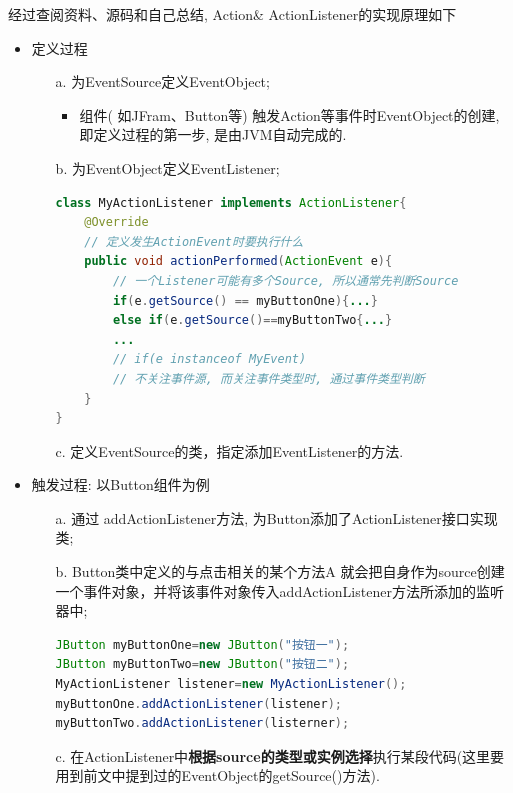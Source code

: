 \documentclass[12pt, a4paper, oneside]{ctexart}
\begin{document}
经过查阅资料、源码和自己总结, Action\& ActionListener的实现原理如下
\begin{itemize}
    \item 定义过程
    \begin{enumerate}
        \item[a.] 为EventSource定义EventObject; 
        \begin{itemize}
            \item 组件( 如JFram、Button等) 触发Action等事件时EventObject的创建, 即定义过程的第一步, 是由JVM自动完成的. 
        \end{itemize}
        \item[b.] 为EventObject定义EventListener; 
        \begin{lstlisting}[language = java]
class MyActionListener implements ActionListener{
    @Override
    // 定义发生ActionEvent时要执行什么
    public void actionPerformed(ActionEvent e){
        // 一个Listener可能有多个Source, 所以通常先判断Source
        if(e.getSource() == myButtonOne){...}
        else if(e.getSource()==myButtonTwo{...}
        ...
        // if(e instanceof MyEvent)   
        // 不关注事件源, 而关注事件类型时, 通过事件类型判断
    }
}   
        \end{lstlisting}
        \item[c.] 定义EventSource的类，指定添加EventListener的方法. 
    \end{enumerate}
    \item 触发过程: 以Button组件为例
    \begin{enumerate}
        \item[a.] 通过 addActionListener方法, 为Button添加了ActionListener接口实现类; 
        \item[b.] Button类中定义的与点击相关的某个方法A 就会把自身作为source创建一个事件对象，并将该事件对象传入addActionListener方法所添加的监听器中; 
        \begin{lstlisting}[language = java]
JButton myButtonOne=new JButton("按钮一");
JButton myButtonTwo=new JButton("按钮二");
MyActionListener listener=new MyActionListener();
myButtonOne.addActionListener(listener);
myButtonTwo.addActionListener(listerner);
        \end{lstlisting}
        \item[c.] 在ActionListener中\textbf{根据source的类型或实例选择}执行某段代码(这里要用到前文中提到过的EventObject的getSource()方法). 
    \end{enumerate}
\end{itemize}
\end{document}
